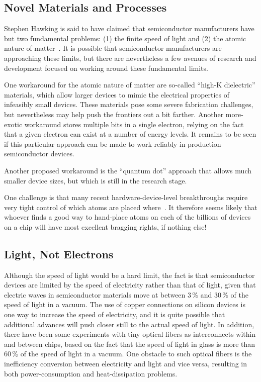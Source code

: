 \subsection{Novel Materials and Processes}
\label{sec:cpu:Novel Materials and Processes}

Stephen Hawking is said to have claimed that semiconductor manufacturers
have but two fundamental problems: (1) the finite speed of light and
(2) the atomic nature of matter~\cite{BryanGardiner2007}.
It is possible that semiconductor manufacturers are approaching these
limits, but there are nevertheless a few avenues of research and
development focused on working around these fundamental limits.

One workaround for the atomic nature of matter are so-called
``high-K dielectric'' materials, which allow larger devices to mimic the
electrical properties of infeasibly small devices.
These materials pose some severe fabrication challenges, but nevertheless
may help push the frontiers out a bit farther.
Another more-exotic workaround stores multiple bits in a single electron,
relying on the fact that a given electron can exist at a number of
energy levels.
It remains to be seen if this particular approach can be made to work
reliably in production semiconductor devices.

Another proposed workaround is the ``quantum dot'' approach that
allows much smaller device sizes, but which is still in the research
stage.

One challenge is that many recent hardware-device-level breakthroughs
require very tight control of which atoms are placed
where~\cite{MichaelJKelly2017DeviceLevel}.
It therefore seems likely that whoever finds a good way to hand-place
atoms on each of the billions of devices on a chip will have most
excellent bragging rights, if nothing else!

\subsection{Light, Not Electrons}
\label{sec:cpu:Light, Not Electrons}

Although the speed of light would be a hard limit, the fact is that
semiconductor devices are limited by the speed of electricity rather
than that of light, given that electric waves in semiconductor materials
move at between 3\,\% and 30\,\% of the speed of light in a vacuum.
The use of copper connections on silicon devices is one way to increase
the speed of electricity, and it is quite possible that additional
advances will push closer still to the actual speed of light.
In addition, there have been some experiments with tiny optical fibers
as interconnects within and between chips, based on the fact that
the speed of light in glass is more than 60\,\% of the speed of light
in a vacuum.
One obstacle to such optical fibers is the inefficiency conversion
between electricity and light and vice versa, resulting in both
power-consumption and heat-dissipation problems.

